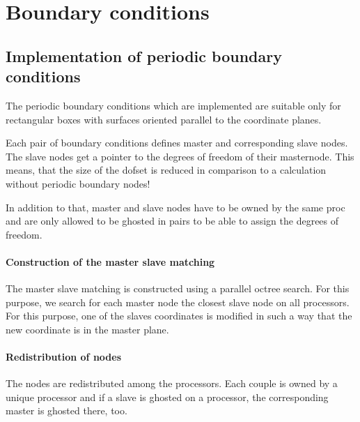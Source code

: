\chapter{Boundary conditions}



\section{Implementation of periodic boundary conditions}

The periodic boundary conditions which are implemented are suitable only for
rectangular boxes with surfaces oriented parallel to the coordinate planes.

Each pair of boundary conditions defines master and corresponding slave
nodes. The slave nodes get a pointer to the degrees of freedom of their
masternode. This means, that the size of the dofset is reduced in comparison
to a calculation without periodic boundary nodes!

In addition to that, master and slave nodes have to be owned by the same proc
and are only allowed to be ghosted in pairs to be able to assign the degrees
of freedom.

\subsubsection{Construction of the master slave matching}
The master slave matching is constructed using a parallel octree search. For
this purpose, we search for each master node the closest slave node on all
processors. For this purpose, one of the slaves coordinates is modified
in such a way that the new coordinate is in the master plane.

\subsubsection{Redistribution of nodes}
The nodes are redistributed among the processors. Each couple is owned by a
unique processor and if a slave is ghosted on a processor, the corresponding
master is ghosted there, too.

